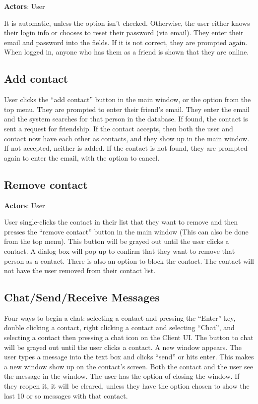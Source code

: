 {\bf Actors}: User

It is automatic, unless the option isn’t checked. Otherwise, the user either knows their login info or chooses to reset their password (via email). They enter their email and password into the fields. If it is not correct, they are prompted again. When logged in, anyone who has them as a friend is shown that they are online.

\subsection{Add contact}

User clicks the “add contact” button in the main window, or the option from the top menu. They are prompted to enter their friend’s email. They enter the email and the system searches for that person in the database. If found, the contact is sent a request for friendship. If the contact accepts, then both the user and contact now have each other as contacts, and they show up in the main window. If not accepted, neither is added. If the contact is not found, they are prompted again to enter the email, with the option to cancel.

\subsection{Remove contact}

{\bf Actors}: User

User single-clicks the contact in their list that they want to remove and then presses the “remove contact” button in the main window (This can also be done from the top menu). This button will be grayed out until the user clicks a contact. A dialog box will pop up to confirm that they want to remove that person as a contact. There is also an option to block the contact. The contact will not have the user removed from their contact list.

\subsection{Chat/Send/Receive Messages}

Four ways to begin a chat: selecting a contact and pressing the “Enter” key, double clicking a contact, right clicking a contact and selecting “Chat”, and selecting a contact then pressing a chat icon on the Client UI. The button to chat will be grayed out until the user clicks a contact.
A new window appears. The user types a message into the text box and clicks “send” or hits enter. This makes a new window show up on the contact's screen. Both the contact and the user see the message in the window. The user has the option of closing the window. If they reopen it, it will be cleared, unless they have the option chosen to show the last 10 or so messages with that contact.

